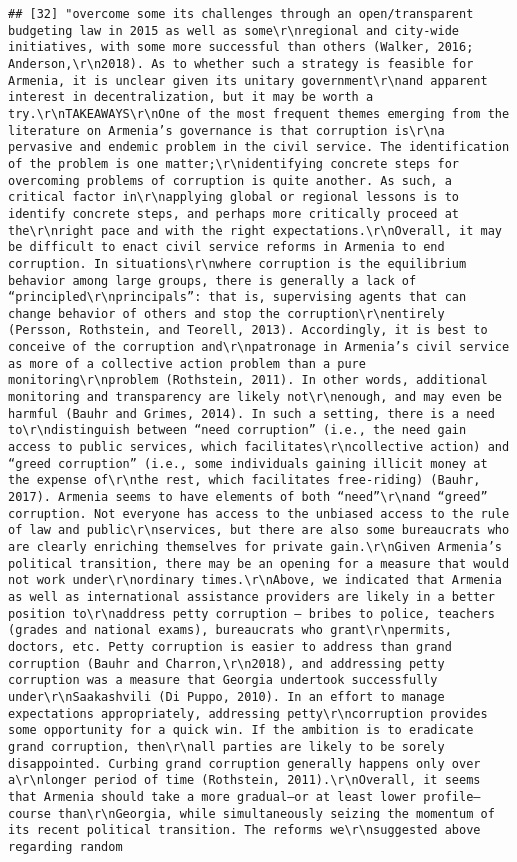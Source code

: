 \documentclass[
]{article}
\begin{document}
\begin{verbatim}
## [32] "overcome some its challenges through an open/transparent budgeting law in 2015 as well as some\r\nregional and city-wide initiatives, with some more successful than others (Walker, 2016; Anderson,\r\n2018). As to whether such a strategy is feasible for Armenia, it is unclear given its unitary government\r\nand apparent interest in decentralization, but it may be worth a try.\r\nTAKEAWAYS\r\nOne of the most frequent themes emerging from the literature on Armenia’s governance is that corruption is\r\na pervasive and endemic problem in the civil service. The identification of the problem is one matter;\r\nidentifying concrete steps for overcoming problems of corruption is quite another. As such, a critical factor in\r\napplying global or regional lessons is to identify concrete steps, and perhaps more critically proceed at the\r\nright pace and with the right expectations.\r\nOverall, it may be difficult to enact civil service reforms in Armenia to end corruption. In situations\r\nwhere corruption is the equilibrium behavior among large groups, there is generally a lack of “principled\r\nprincipals”: that is, supervising agents that can change behavior of others and stop the corruption\r\nentirely (Persson, Rothstein, and Teorell, 2013). Accordingly, it is best to conceive of the corruption and\r\npatronage in Armenia’s civil service as more of a collective action problem than a pure monitoring\r\nproblem (Rothstein, 2011). In other words, additional monitoring and transparency are likely not\r\nenough, and may even be harmful (Bauhr and Grimes, 2014). In such a setting, there is a need to\r\ndistinguish between “need corruption” (i.e., the need gain access to public services, which facilitates\r\ncollective action) and “greed corruption” (i.e., some individuals gaining illicit money at the expense of\r\nthe rest, which facilitates free-riding) (Bauhr, 2017). Armenia seems to have elements of both “need”\r\nand “greed” corruption. Not everyone has access to the unbiased access to the rule of law and public\r\nservices, but there are also some bureaucrats who are clearly enriching themselves for private gain.\r\nGiven Armenia’s political transition, there may be an opening for a measure that would not work under\r\nordinary times.\r\nAbove, we indicated that Armenia as well as international assistance providers are likely in a better position to\r\naddress petty corruption — bribes to police, teachers (grades and national exams), bureaucrats who grant\r\npermits, doctors, etc. Petty corruption is easier to address than grand corruption (Bauhr and Charron,\r\n2018), and addressing petty corruption was a measure that Georgia undertook successfully under\r\nSaakashvili (Di Puppo, 2010). In an effort to manage expectations appropriately, addressing petty\r\ncorruption provides some opportunity for a quick win. If the ambition is to eradicate grand corruption, then\r\nall parties are likely to be sorely disappointed. Curbing grand corruption generally happens only over a\r\nlonger period of time (Rothstein, 2011).\r\nOverall, it seems that Armenia should take a more gradual—or at least lower profile—course than\r\nGeorgia, while simultaneously seizing the momentum of its recent political transition. The reforms we\r\nsuggested above regarding random 
\end{verbatim}
\end{document}
